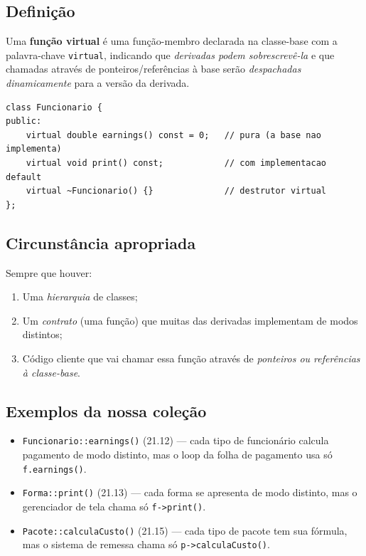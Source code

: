 \documentclass[11pt,a4paper]{article}
\begin{document}
\subsection*{Defini\c{c}\~ao}

Uma \textbf{fun\c{c}\~ao virtual} \'e uma fun\c{c}\~ao-membro declarada na classe-base com a palavra-chave \texttt{virtual}, indicando que \emph{derivadas podem sobrescrev\^e-la} e que chamadas atrav\'es de ponteiros/refer\^encias \`a base ser\~ao \emph{despachadas dinamicamente} para a vers\~ao da derivada.

\begin{lstlisting}[style=cppcode,numbers=none]
class Funcionario {
public:
    virtual double earnings() const = 0;   // pura (a base nao implementa)
    virtual void print() const;            // com implementacao default
    virtual ~Funcionario() {}              // destrutor virtual
};
\end{lstlisting}

\subsection*{Circunst\^ancia apropriada}

Sempre que houver:
\begin{enumerate}[leftmargin=*,itemsep=0pt]
  \item Uma \emph{hierarquia} de classes;
  \item Um \emph{contrato} (uma fun\c{c}\~ao) que muitas das derivadas implementam de modos distintos;
  \item C\'odigo cliente que vai chamar essa fun\c{c}\~ao atrav\'es de \emph{ponteiros ou refer\^encias \`a classe-base}.
\end{enumerate}

\subsection*{Exemplos da nossa cole\c{c}\~ao}

\begin{itemize}[leftmargin=*,itemsep=0pt]
  \item \texttt{Funcionario::earnings()} (21.12) --- cada tipo de funcion\'ario calcula pagamento de modo distinto, mas o loop da folha de pagamento usa s\'o \texttt{f.earnings()}.
  \item \texttt{Forma::print()} (21.13) --- cada forma se apresenta de modo distinto, mas o gerenciador de tela chama s\'o \texttt{f->print()}.
  \item \texttt{Pacote::calculaCusto()} (21.15) --- cada tipo de pacote tem sua f\'ormula, mas o sistema de remessa chama s\'o \texttt{p->calculaCusto()}.
\end{itemize}
\end{document}
